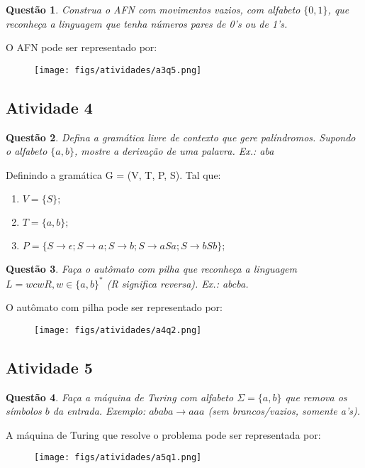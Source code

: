 \documentclass{article}
\newtheorem{problem}{Questão}
\begin{document}
\begin{problem} Construa o AFN com movimentos vazios, com alfabeto $\{0,1\}$, que reconheça a linguagem que tenha números pares de 0's ou de 1's.
\end{problem}

\begin{solution}
O AFN pode ser representado por:
    \begin{figure}[H]
        \centering
        \texttt{[image: figs/atividades/a3q5.png]}
    \end{figure}
\end{solution}


\subsection{Atividade 4}
\begin{problem} Defina a gramática livre de contexto que gere palíndromos. Supondo o alfabeto $\{a,b\}$, mostre a derivação de uma palavra. Ex.: aba
\end{problem}

\begin{solution}
 Definindo a gramática G = (V, T, P, S). Tal que:
 
\begin{enumerate}[label=]
    \item $V = \{S\};$
    \item $T = \{a, b\};$
    \item $P = \{S \rightarrow \epsilon; S \rightarrow a; S \rightarrow  b; S \rightarrow aSa; S \rightarrow bSb\};$
\end{enumerate}

\end{solution}
\begin{problem} Faça o autômato com pilha que reconheça a linguagem $L=wcwR, w \in \{a,b\}^{*}$ (R significa reversa). Ex.: abcba.
\end{problem}
\begin{solution}
O autômato com pilha pode ser representado por:
\begin{figure}[H]
        \centering
        \texttt{[image: figs/atividades/a4q2.png]}
\end{figure}


\end{solution}

\subsection{Atividade 5} 
\begin{problem} Faça a máquina de Turing com alfabeto $\Sigma =\{a,b\}$ que remova os símbolos $b$ da entrada. Exemplo:
$ababa \rightarrow aaa$ (sem brancos/vazios, somente a's).
\end{problem}
\begin{solution} A máquina de Turing que resolve o problema pode ser representada por:
\begin{figure}[H]
        \centering
        \texttt{[image: figs/atividades/a5q1.png]}
\end{figure}

\end{solution}
\end{document}
